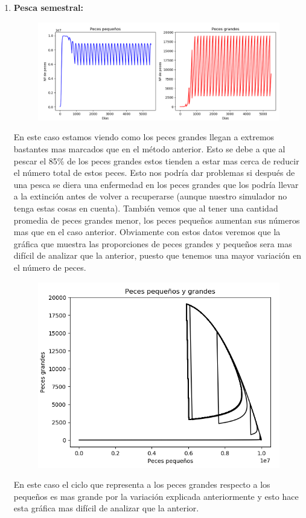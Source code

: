 \documentclass[]{article}
\begin{document}
\begin{enumerate}
	\item \textbf{Pesca semestral:}
	\begin{figure}[H]
		\centering
		\includegraphics[width=1\linewidth]{img/screenshot0028}
		\label{fig:screenshot0028}
	\end{figure}
	En este caso estamos viendo como los peces grandes llegan a extremos bastantes mas marcados que en el método anterior. Esto se debe a que al pescar el 85\% de los peces grandes estos tienden a estar mas cerca de reducir el número total de estos peces. Esto nos podría dar problemas si después de una pesca se diera una enfermedad en los peces grandes que los podría llevar a la extinción antes de volver a recuperarse (aunque nuestro simulador no tenga estas cosas en cuenta). También vemos que al tener una cantidad promedia de peces grandes menor, los peces pequeños aumentan sus números mas que en el caso anterior. 
	\newpage
	Obviamente con estos datos veremos que la gráfica que muestra las proporciones de peces grandes y pequeños sera mas difícil de analizar que la anterior, puesto que tenemos una mayor variación en el número de peces.
	
	\begin{figure}[H]
		\centering
		\includegraphics[width=0.7\linewidth]{img/screenshot0029}
		\label{fig:screenshot0029}
	\end{figure}
	En este caso el ciclo que representa a los peces grandes respecto a los pequeños es mas grande por la variación explicada anteriormente y esto hace esta gráfica mas difícil de analizar que la anterior.
\end{enumerate}










 
 
	
\end{document}
